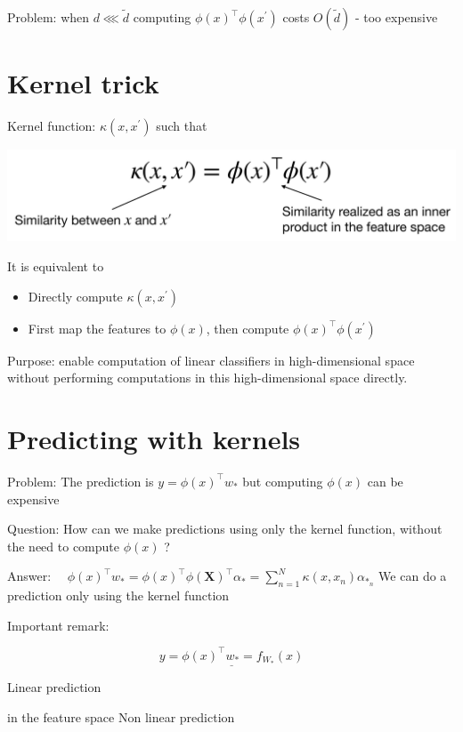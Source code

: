 \documentclass[10pt]{article}
\begin{document}
Problem: when $d \lll \tilde{d}$ computing $\phi(x)^{\top} \phi\left(x^{\prime}\right)$ costs $O(\tilde{d})$ - too expensive

\section*{Kernel trick}
Kernel function: $\kappa\left(x, x^{\prime}\right)$ such that

\begin{center}
\includegraphics[max width=\textwidth]{2023_12_30_94b0d65233167cf65e4cg-12}
\end{center}

It is equivalent to

\begin{itemize}
  \item Directly compute $\kappa\left(x, x^{\prime}\right)$
  \item First map the features to $\phi(x)$, then compute $\phi(x)^{\top} \phi\left(x^{\prime}\right)$
\end{itemize}

Purpose: enable computation of linear classifiers in high-dimensional space without performing computations in this high-dimensional space directly.

\section*{Predicting with kernels}
Problem: The prediction is $y=\phi(x)^{\top} w_{*}$ but computing $\phi(x)$ can be expensive

Question: How can we make predictions using only the kernel function, without the need to compute $\phi(x)$ ?

Answer: $\quad \phi(x)^{\top} w_{*}=\phi(x)^{\top} \phi(\mathbf{X})^{\top} \alpha_{*}=\sum_{n=1}^{N} \kappa\left(x, x_{n}\right) \alpha_{*_{n}}$ We can do a prediction only using the kernel function

Important remark:

$$
\underline{y=\phi(x)^{\top} w_{*}=f_{W_{*}}(x)}
$$

Linear prediction

in the feature space
Non linear prediction
\end{document}
